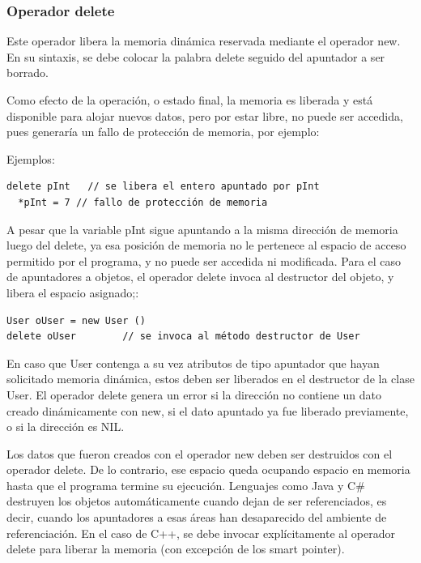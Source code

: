 \subsubsection{Operador delete}

Este operador libera la memoria dinámica reservada mediante el operador new. En su sintaxis, se debe colocar la palabra delete seguido del apuntador a ser borrado.

Como efecto de la operación, o estado final, la memoria es liberada y está disponible para alojar nuevos datos, pero por estar libre, no puede ser accedida, pues generaría un fallo de protección de memoria, por ejemplo:

Ejemplos:
\begin{lstlisting}[upquote=true, language=pseudo]
  delete pInt	// se libera el entero apuntado por pInt
  *pInt = 7	// fallo de protección de memoria
\end{lstlisting}

A pesar que la variable pInt sigue apuntando a la misma dirección de memoria luego del delete, ya esa posición de memoria no le pertenece al espacio de acceso permitido por el programa, y no puede ser accedida ni modificada. Para el caso de apuntadores a objetos, el operador delete invoca al destructor del objeto, y libera el espacio asignado;:

\begin{lstlisting}[upquote=true, language=pseudo]
User oUser = new User ()	
delete oUser		// se invoca al método destructor de User
\end{lstlisting}

En caso que User contenga a su vez atributos de tipo apuntador que hayan solicitado memoria dinámica, estos deben ser liberados en el destructor de la clase User. El operador delete genera un error si la dirección no contiene un dato creado dinámicamente con new, si el dato apuntado ya fue liberado previamente, o si la dirección es NIL.

Los datos que fueron creados con el operador new deben ser destruidos con el operador delete. De lo contrario, ese espacio queda ocupando espacio en memoria hasta que el programa termine su ejecución. Lenguajes como Java y C\# destruyen los objetos automáticamente cuando dejan de ser referenciados, es decir, cuando los apuntadores a esas áreas han desaparecido del ambiente de referenciación. En el caso de C++, se debe invocar explícitamente al operador delete para liberar la memoria (con excepción de los smart pointer).

